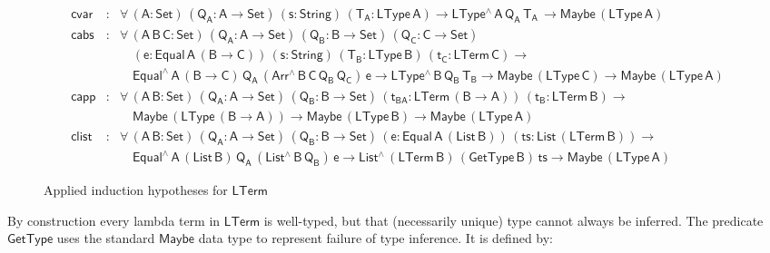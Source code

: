 \documentclass[sigplan,screen]{acmart}
\begin{document}
\begin{figure*}[t]

\begin{adjustbox}{varwidth=7.3in, max width=7.1in, margin=-0.0in 0in
      -0.2in 0in, center} 

{\small
\[\begin{array}{lll}
\mathsf{cvar} & : & \mathsf{\forall\, (A : Set)\, (Q_A : A \to Set)\,
  (s : String)\, (T_A : LType\, A) \to LType^{\wedge} \, A\, Q_A\,
  T_A\, \to Maybe\, (LType\, A)}\\
 \mathsf{cabs} & : & \mathsf{\forall\, (A \, B\, C: Set)\, (Q_A : A
   \to Set)\, (Q_B : B \to Set)\, (Q_C : C \to Set)} \\ 
& &    \quad\mathsf{(e : Equal\, A\, (B \to C))\, (s : String)\, (T_B
   : LType\, B)\, (t_C : LTerm \, C)  \to} \\  
& & \quad\mathsf{Equal^{\wedge}\, A\, (B \to C)\, Q_A\,
   (Arr^{\wedge}\, B\, C\, Q_B\, Q_C)\, e  \to LType^{\wedge} \, B\,
   Q_B\, T_B  \to Maybe\, (LType\,C) \to Maybe\, (LType\, A)}\\
\mathsf{capp} & : & \mathsf{\forall\, (A \, B : Set)\, (Q_A : A \to
  Set)\, (Q_B : B \to Set)\,  (t_{BA}: LTerm\, (B \to A))\, (t_B :
  LTerm\, B)\to} \\  
& & \quad\mathsf{ Maybe\, (LType\, (B \to A))\to Maybe\, (LType\,
      B) \to Maybe\, (LType\, A)}\\
\mathsf{clist} & : & \mathsf{\forall\, (A \, B : Set)\, (Q_A : A \to
  Set)\, (Q_B : B \to Set)\, (e : Equal\, A\, (List\, B))\, (ts : 
  List\, (LTerm\, B)) \to}\\  
& & \quad\mathsf{Equal^{\wedge}\, A\, (List\,B) \, Q_A\,
  (List^{\wedge}\, B\, Q_B)\, e \to List^{\wedge}\, (LTerm\, B)\,
  (GetType\, B)\, ts \to Maybe\, (LType\, A)}
\end{array}\]}

\vspace*{-0.1in}

\caption{Applied induction hypotheses for
  $\mathsf{LTerm}$}\label{fig:ind-hyps-lterm-applied-to-P}
\end{adjustbox}
\end{figure*}

By construction every lambda term in $\mathsf{LTerm}$ is well-typed,
but that (necessarily unique) type cannot always be inferred.  The
predicate $\mathsf{GetType}$ uses the standard $\mathsf{Maybe}$ data
type to represent failure of type inference. It is defined
by:

\vspace*{-0.1in}
\end{document}
